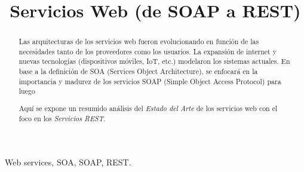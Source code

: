\documentclass[conference]{IEEEtran}
\begin{document}
%
\title{Servicios Web (de SOAP a REST)}

\author{
}



\maketitle


\begin{abstract}
  Las arquitecturas de los servicios web fueron evolucionando en
  función de las necesidades tanto de los proveedores como los
  usuarios. La expansión de internet y nuevas tecnologías
  (dispositivos móviles, IoT, etc.) modelaron los sistemas
  actuales. En base a la definición de SOA (Services Object
  Architecture), se enfocará en la importancia y madurez de los
  servicios SOAP (Simple Object Access Protocol) para luego 



Aquí se expone un resumido análisis del \emph{Estado del
    Arte} de los servicios web con el foco en los \emph{Servicios
    REST}.

\end{abstract}

\begin{IEEEkeywords}
Web services, SOA, SOAP, REST.
\end{IEEEkeywords}



%
\IEEEpeerreviewmaketitle
\end{document}
